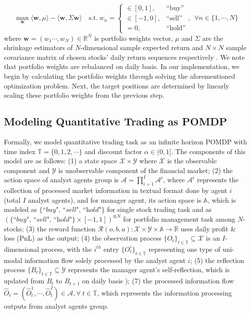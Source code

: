 \begin{equation}
\label{mean-variance}
\max_{\textbf{w}} \langle \textbf{w},\mu \rangle-\langle \textbf{w},\Sigma \textbf{w}\rangle \quad
\text{s.t.}~ w_n = \begin{cases} 
\in [0,1], & \text{``buy''} \\
\in [-1, 0], & \text{``sell''} \\
=0, & \text{``hold''} 
\end{cases},~~\forall n\in\{1,\cdots,N\}
\end{equation}
where $\textbf{w}=(w_1\cdots,w_N)\in\mathbb{R}^N$ is portfolio weights vector, $\mu$ and $\Sigma$ are the shrinkage estimators of $N$-dimensional sample expected return and $N\times N$ sample covariance matrix of chosen stocks' daily return sequences respectively \cite{fabozzi2010quantitative}. We note that portfolio weights are rebalanced on daily basis. In our implementation, we begin by calculating the portfolio weights through solving the aforementioned optimization problem. Next, the target positions are determined by linearly scaling these portfolio weights from the previous step.

\subsection{Modeling Quantitative Trading as POMDP}
Formally, we model quantitative trading task as an infinite horizon POMDP \cite{liu2020adaptive,kabbani2022deep} with time index $\mathbb{T}=\{0,1,2,\cdots\}$ and discount factor $\alpha\in(0,1]$. The components of this model are as follows: (1) a state space $\mathcal{X}\times\mathcal{Y}$ where $\mathcal{X}$ is the observable component and $\mathcal{Y}$ is unobservable component of the financial market; (2) the action space of analyst agents group is $\mathcal{A}=\prod_{i=1}^{I}\mathcal{A}^i$, where $\mathcal{A}^i$ represents the collection of processed market information in textual format done by agent $i$ (total $I$ analyst agents), and for manager agent, its action space is $\mathbb{A}$, which is modeled as {$\{\textit{``buy",~``sell",~``hold"}\}$ for single stock trading task and as $(\{\textit{``buy",~``sell",~``hold"}\}\times[-1,1])^{\otimes N}$ for portfolio management task among $N$-stocks}; (3) the reward function $\mathcal{R}(o,b,a):\mathcal{X}\times\mathcal{Y}\times\mathbb{A}\to\mathbb{R}$ uses daily profit \& loss (PnL) as the output; (4) the observation process $\{O_t\}_{t\in\mathbb{T}}\subseteq\mathcal{X}$ is an $I$-dimensional process, with the $i^{th}$ entry $\{O_t^i\}_{t\in\mathbb{T}}$ representing one type of uni-modal information flow solely processed by the analyst agent $i$; (5) the reflection process $\{B_t\}_{t\in\mathbb{T}}\subseteq\mathcal{Y}$ represents the manager agent's self-reflection, which is updated from $B_t$ to $B_{t+1}$ on daily basis \cite{griffiths2023bayes}); (7) the processed information flow $\hat{O}_t=(\hat{O}_t^1,\cdots,\hat{O}_t^{I})\in\mathcal{A},\forall~t\in\mathbb{T}$, which represents the information processing outputs from analyst agents group. 

